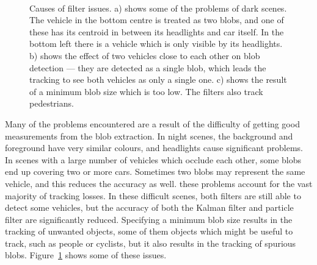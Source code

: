 \documentclass[conference]{IEEEtran}
\begin{document}
\begin{figure}
{  }\\
  
  \caption{Causes of filter issues. a) shows some of the problems of dark
    scenes. The vehicle in the bottom centre is treated as two blobs, and one of
    these has its centroid in between its headlights and car itself. In the
    bottom left there is a vehicle which is only visible by its headlights. b)
    shows the effect of two vehicles close to each other on blob detection ---
    they are detected as a single blob, which leads the tracking to see both
    vehicles as only a single one. c) shows the result of a minimum blob size
    which is too low. The filters also track pedestrians.}
  \label{fig:blobissue}
\end{figure}

Many of the problems encountered are a result of the difficulty of getting good
measurements from the blob extraction. In night scenes, the background and
foreground have very similar colours, and headlights cause significant
problems. In scenes with a large number of vehicles which occlude each other,
some blobs end up covering two or more cars. Sometimes two blobs may represent
the same vehicle, and this reduces the accuracy as well. these problems account
for the vast majority of tracking losses. In these difficult scenes, both
filters are still able to detect some vehicles, but the accuracy of both the
Kalman filter and particle filter are significantly reduced. Specifying a
minimum blob size results in the tracking of unwanted objects, some of them
objects which might be useful to track, such as people or cyclists, but it also
results in the tracking of spurious blobs. Figure~\ref{fig:blobissue} shows some
of these issues.
\end{document}
